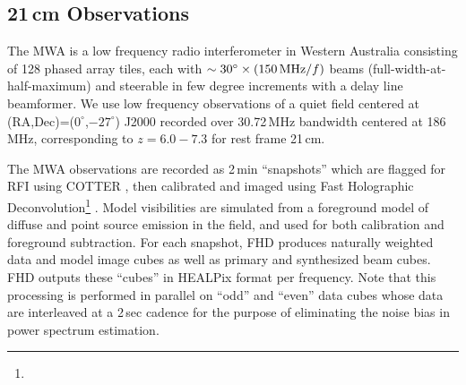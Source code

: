 \documentclass{emulateapj}
\begin{document}
\subsection{21\,cm Observations}
\label{sec:mwaobservations}

The MWA is a low frequency radio interferometer in Western Australia consisting of 128 phased array tiles, each with $\sim30^\circ\times(150\text{\,MHz}/f)$  beams (full-width-at-half-maximum) and steerable in few degree increments with a delay line beamformer. We use low frequency observations of a quiet field centered at (RA,Dec)=($0^\circ$,$-27^\circ$) J2000 recorded over 30.72\,MHz bandwidth centered at 186\,MHz, corresponding to $z=6.0-7.3$ for rest frame 21\,cm. 

The MWA observations are recorded as 2\,min ``snapshots'' which are flagged for RFI using COTTER \citep{AndreMWARFI}, then calibrated and imaged using Fast Holographic Deconvolution\footnote{} \citep{fhd}. Model visibilities are simulated from a foreground model of diffuse \citep{beardsley16} and point source \citep{PattiCatalog1} emission in the field, and used for both calibration and foreground subtraction. For each snapshot, FHD produces naturally weighted data and model image cubes as well as primary and synthesized beam cubes. FHD outputs these ``cubes'' in HEALPix format per frequency. Note that this processing is performed in parallel on ``odd'' and ``even'' data cubes whose data are interleaved at a 2\,sec cadence for the purpose of eliminating the noise bias in power spectrum estimation. 
\end{document}
